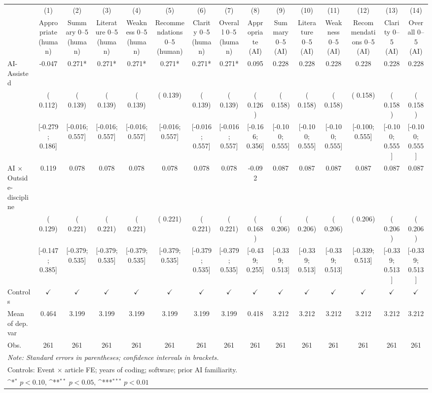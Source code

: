 \def\sym#1{\ifmmode^{#1}\else\(^{#1}\)\fi}
\begin{tabular}{l*{14}{c}}
\hline\hline
 & (1) & (2) & (3) & (4) & (5) & (6) & (7) & (8) & (9) & (10) & (11) & (12) & (13) & (14)
\\
 & Appropriate (human) & Summary 0–5 (human) & Literature 0–5 (human) & Weakness 0–5 (human) & Recommendations 0–5 (human) & Clarity 0–5 (human) & Overall 0–5 (human) & Appropriate (AI) & Summary 0–5 (AI) & Literature 0–5 (AI) & Weakness 0–5 (AI) & Recommendations 0–5 (AI) & Clarity 0–5 (AI) & Overall 0–5 (AI)
 \\
\hline
AI-Assisted & -0.047 &  0.271* &  0.271* &  0.271* &  0.271* &  0.271* &  0.271* &  0.095 &  0.228 &  0.228 &  0.228 &  0.228 &  0.228 &  0.228
\\
 & ( 0.112) & ( 0.139) & ( 0.139) & ( 0.139) & ( 0.139) & ( 0.139) & ( 0.139) & ( 0.126) & ( 0.158) & ( 0.158) & ( 0.158) & ( 0.158) & ( 0.158) & ( 0.158)
\\
 & [-0.279;  0.186] & [-0.016;  0.557] & [-0.016;  0.557] & [-0.016;  0.557] & [-0.016;  0.557] & [-0.016;  0.557] & [-0.016;  0.557] & [-0.166;  0.356] & [-0.100;  0.555] & [-0.100;  0.555] & [-0.100;  0.555] & [-0.100;  0.555] & [-0.100;  0.555] & [-0.100;  0.555]
\\
AI × Outside-discipline &  0.119 &  0.078 &  0.078 &  0.078 &  0.078 &  0.078 &  0.078 & -0.092 &  0.087 &  0.087 &  0.087 &  0.087 &  0.087 &  0.087
\\
 & ( 0.129) & ( 0.221) & ( 0.221) & ( 0.221) & ( 0.221) & ( 0.221) & ( 0.221) & ( 0.168) & ( 0.206) & ( 0.206) & ( 0.206) & ( 0.206) & ( 0.206) & ( 0.206)
\\
 & [-0.147;  0.385] & [-0.379;  0.535] & [-0.379;  0.535] & [-0.379;  0.535] & [-0.379;  0.535] & [-0.379;  0.535] & [-0.379;  0.535] & [-0.439;  0.255] & [-0.339;  0.513] & [-0.339;  0.513] & [-0.339;  0.513] & [-0.339;  0.513] & [-0.339;  0.513] & [-0.339;  0.513]
\\
\hline
Controls & $\checkmark$ & $\checkmark$ & $\checkmark$ & $\checkmark$ & $\checkmark$ & $\checkmark$ & $\checkmark$ & $\checkmark$ & $\checkmark$ & $\checkmark$ & $\checkmark$ & $\checkmark$ & $\checkmark$ & $\checkmark$
\\
Mean of dep. var &  0.464 &  3.199 &  3.199 &  3.199 &  3.199 &  3.199 &  3.199 &  0.418 &  3.212 &  3.212 &  3.212 &  3.212 &  3.212 &  3.212
\\
Obs. & 261 & 261 & 261 & 261 & 261 & 261 & 261 & 261 & 261 & 261 & 261 & 261 & 261 & 261
\\
\hline
\hline\hline
\multicolumn{15}{l}{\it{Note:} Standard errors in parentheses; confidence intervals in brackets.}\\
\multicolumn{15}{l}{Controls: Event $\times$ article FE; years of coding; software; prior AI familiarity.}\\
\multicolumn{15}{l}{\sym{*} $p<0.10$, \sym{**} $p<0.05$,  \sym{***} $p<0.01$}\\
\end{tabular}
